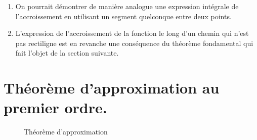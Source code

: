 \begin{rems}
 \begin{enumerate}
 \item On pourrait démontrer de manière analogue une expression intégrale de l'accroissement en utilisant un segment quelconque entre deux points.
\item L'expression de l'accroissement de la fonction le long d'un chemin qui n'est pas rectiligne est en revanche une conséquence du théorème fondamental qui fait l'objet de la section suivante.
\end{enumerate}

\end{rems}

\section{Théorème d'approximation au premier ordre.}
\begin{figure}[ht]
 \centering
 
 \caption{Théorème d'approximation}
 \label{fig:C6308_1}
\end{figure}

